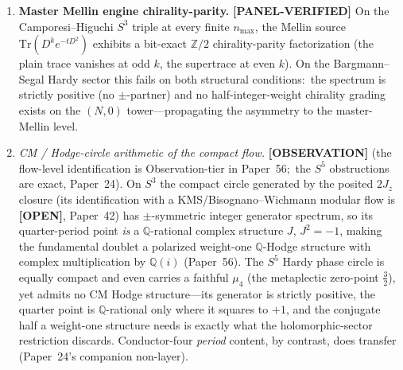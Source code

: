 \documentclass[aps,pra,twocolumn,superscriptaddress,longbibliography]{revtex4-2}
\begin{document}
\begin{enumerate}
\item \textbf{Master Mellin engine chirality-parity.}  \textbf{[PANEL-VERIFIED]} On the
Camporesi--Higuchi $S^3$ triple at every finite $n_{\max}$, the Mellin
source $\mathrm{Tr}(D^k e^{-t D^2})$ exhibits a bit-exact
$\mathbb{Z}/2$ chirality-parity factorization (the plain trace
vanishes at odd $k$, the supertrace at even $k$).  On the
Bargmann--Segal Hardy sector this fails on both structural conditions:\
the spectrum is strictly positive (no $\pm$-partner) and no
half-integer-weight chirality grading exists on the $(N, 0)$
tower---propagating the asymmetry to the master-Mellin level.
\item \emph{CM / Hodge-circle arithmetic of the compact flow.}
\textbf{[OBSERVATION]} (the flow-level identification is
Observation-tier in Paper~56;\ the $S^5$ obstructions are exact,
Paper~24).  On
$S^3$ the compact circle generated by the posited $2J_z$ closure (its
identification with a KMS/Bisognano--Wichmann modular flow is
\textbf{[OPEN]}, Paper~42) has $\pm$-symmetric
integer generator spectrum, so its quarter-period point \emph{is} a
$\mathbb{Q}$-rational complex structure $J$, $J^2=-1$, making the
fundamental doublet a polarized weight-one $\mathbb{Q}$-Hodge structure
with complex multiplication by $\mathbb{Q}(i)$ (Paper~56).  The $S^5$
Hardy phase circle is equally compact and even carries a faithful
$\mu_4$ (the metaplectic zero-point $\tfrac32$), yet admits no CM Hodge
structure---its generator is strictly positive, the quarter point is
$\mathbb{Q}$-rational only where it squares to $+1$, and the conjugate
half a weight-one structure needs is exactly what the holomorphic-sector
restriction discards.  Conductor-four \emph{period} content, by
contrast, does transfer (Paper~24's companion non-layer).
\end{enumerate}
\end{document}
